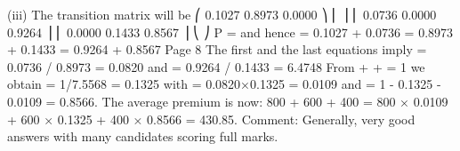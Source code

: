 \documentclass[a4paper,12pt]{article}
\begin{document}
(iii)
The transition matrix will be
⎛ 0.1027 0.8973 0.0000 ⎞
⎜
⎟
⎜ 0.0736 0.0000 0.9264 ⎟
⎜ 0.0000 0.1433 0.8567 ⎟
⎝
⎠
\pi P = \pi and hence
 = 0.1027 + 0.0736
 = 0.8973 + 0.1433
 = 0.9264 + 0.8567
Page 8%
The first and the last equations imply
 = 0.0736 / 0.8973 = 0.0820
and
 = 0.9264 / 0.1433 = 6.4748
From  +  +  = 1 we obtain  = 1/7.5568 = 0.1325
with  = 0.0820×0.1325 = 0.0109 and  = 1 - 0.1325 - 0.0109 = 0.8566.
The average premium is now:
800  + 600  + 400  = 800 × 0.0109 + 600 × 0.1325 + 400 × 0.8566 =
430.85.
Comment: Generally, very good answers with many candidates scoring full marks.
\end{document}
